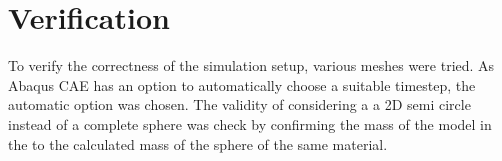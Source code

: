 \section{Verification}

To verify the correctness of the simulation setup, various meshes were tried. 
As Abaqus CAE has an option to automatically choose a suitable timestep, the automatic option was chosen.
The validity of considering a a 2D semi circle instead of a complete sphere was check by confirming the mass of the model in the to the calculated mass of the sphere of the same material.